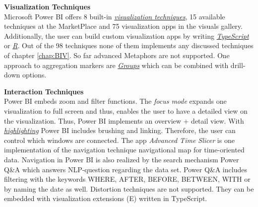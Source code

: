 \textbf{Visualization Techniques}\\
Microsoft Power BI offers 8 built-in \href{https://powerbi.microsoft.com/en-us/documentation/powerbi-service-visualization-types-for-reports-and-q-and-a/}{\textit{visualization techniques}}, 15 available techniques at the MarketPlace and 75 visualization apps in the visuals gallery. Additionally, the user can build custom visualization apps by writing \href{https://powerbi.microsoft.com/en-us/documentation/powerbi-custom-visuals-getting-started-with-developer-tools/}{\textit{TypeScript}} or \href{https://powerbi.microsoft.com/en-us/guided-learning/powerbi-learning-3-11h-r-visual-integration/}{\textit{R}}. Out of the 98 techniques none of them implements any discussed techniques of chapter \ref{chap:BIV}. So far advanced Metaphors are not supported\cite{Amanda}. One approach to aggregation markers are \hyperlink{https://Power BI.microsoft.com/de-de/blog/power-bi-desktop-october-feature-summary/#grouping}{\textit{Groups}} which can be combined with drill-down options.
\par

\textbf{Interaction Techniques}\\
Power BI embeds zoom and filter functions. The \textit{focus mode} expands one visualization to full screen and thus, enables the user to have a detailed view on the visualization. Thus, Power BI implements an overview + detail view. 
With \href{https://powerbi.microsoft.com/en-us/documentation/powerbi-service-about-filters-and-highlighting-in-reports/}{\textit{highlighting}} Power BI includes brushing and linking\cite{Power BIInteract}. Therefore, the user can control which windows are connected. The app \textit{Advanced Time Slicer} is one implementation of the navigation technique navigational map for time-oriented data. Navigation in Power BI is also realized by the search mechanism Power Q\&A which answers NLP-question regarding the data set. Power Q&A includes filtering with the keywords WHERE, AFTER, BEFORE, BETWEEN, WITH or by naming the date as well. Distortion techniques are not supported. They can be embedded with visualization extensions (E) written in TypeScript.

